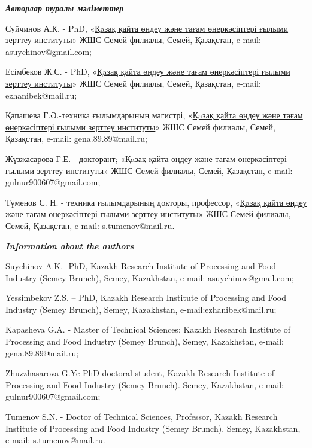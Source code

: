 \begin{authorinfo}
\emph{{\bfseries Авторлар туралы мәліметтер}}

Суйчинов А.К. - PhD, «\href{https://rpf.kz/?lang=kk}{Қaзақ қайта өңдеу
және тағам өнеркәсіптері ғылыми зерттеу институты}» ЖШС Семей филиалы,
Семей, Қазақстан, e-mail: asuychinov@gmail.com;

Есімбеков Ж.С. - PhD, «\href{https://rpf.kz/?lang=kk}{Қaзақ қайта өңдеу
және тағам өнеркәсіптері ғылыми зерттеу институты}» ЖШС Семей филиалы,
Семей, Қазақстан, e-mail: ezhanibek@mail.ru;

Қапашева Г.Ә.-техника ғылымдарының магистрі,
«\href{https://rpf.kz/?lang=kk}{Қaзақ қайта өңдеу және тағам
өнеркәсіптері ғылыми зерттеу институты}» ЖШС Семей филиалы, Семей,
Қазақстан, e-mail: gena.89.89@mail.ru;

Жүзжасарова Г.Е. - докторант; «\href{https://rpf.kz/?lang=kk}{Қaзақ
қайта өңдеу және тағам өнеркәсіптері ғылыми зерттеу институты}» ЖШС
Семей филиалы, Семей, Қазақстан, e-mail: gulnur900607@gmail.com;

Түменов С. Н. - техника ғылымдарының докторы, профессор,
«\href{https://rpf.kz/?lang=kk}{Қaзақ қайта өңдеу және тағам
өнеркәсіптері ғылыми зерттеу институты}» ЖШС Семей филиалы, Семей,
Қазақстан, e-mail: s.tumenov@mail.ru.

\emph{{\bfseries Information about the authors}}

Suychinov A.K.- PhD, Kazakh Research Institute of Processing and Food
Industry (Semey Brunch), Semey, Kazakhstan, e-mail: asuychinov@gmail.com;

Yessimbekov Z.S. -- PhD, Kazakh Research Institute of Processing and
Food Industry (Semey Brunch), Semey, Kazakhstan, e-mail:ezhanibek@mail.ru;

Kapasheva G.A. - Master of Technical Sciences; Kazakh Research Institute
of Processing and Food Industry (Semey Brunch), Semey, Kazakhstan,
e-mail: gena.89.89@mail.ru;

Zhuzzhasarova G.Ye-PhD-doctoral student, Kazakh Research Institute of
Processing and Food Industry (Semey Brunch). Semey, Kazakhstan, e-mail:
gulnur900607@gmail.com;

Tumenov S.N. - Doctor of Technical Sciences, Professor, Kazakh Research
Institute of Processing and Food Industry (Semey Brunch). Semey,
Kazakhstan, e-mail: s.tumenov@mail.ru.
\end{authorinfo}

